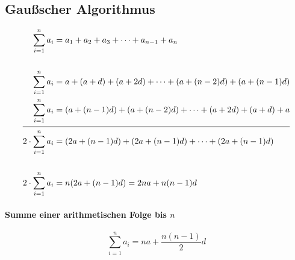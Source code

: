 \subsection{Gaußscher Algorithmus}

\begin{align*}
    \sum_{i=1}^n a_i &= a_1 + a_2 + a_3 + \cdots + a_{n-1} + a_n \\
    \\
    \sum_{i=1}^n a_i &= a + (a + d) + (a + 2d) + \cdots + (a +(n-2) d) + (a + (n - 1) d) \\
    \sum_{i=1}^n a_i &= (a + (n-1)d) + (a +(n-2) d) + \cdots + (a + 2d) + (a + d) + a \\
    \cline{1-2}
    2 \cdot \sum_{i=1}^n a_i &= (2a+(n-1)d) + (2a+(n-1)d) + \cdots + (2a+(n-1)d) \\
    \\
    2 \cdot \sum_{i=1}^n a_i &= n (2a+(n-1)d) = 2n a + n(n-1)d
\end{align*}

\begin{gesetz}
    \paragraph{Summe einer arithmetischen Folge bis \(n\)}
    \[
        \sum_{i=1}^n a_i = n a + \frac{n(n-1)}{2} d
    \]
\end{gesetz}
